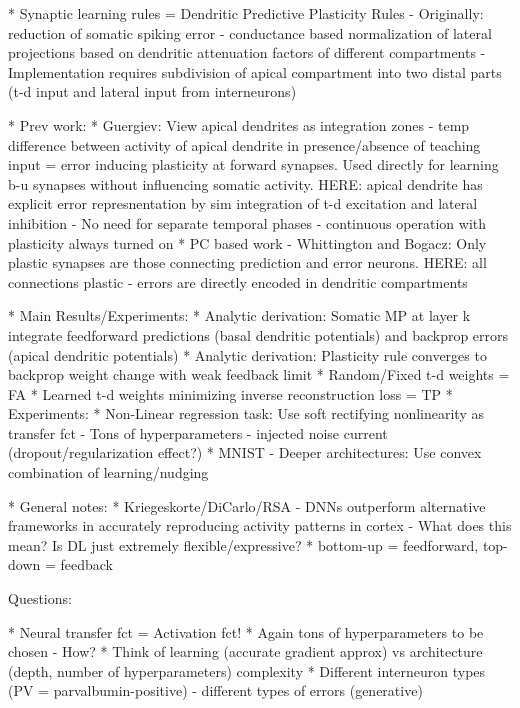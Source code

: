 \documentclass[colorinlistoftodos]{article}
\theoremstyle{definition}
\begin{document}
* Synaptic learning rules = Dendritic Predictive Plasticity Rules
    - Originally: reduction of somatic spiking error
    - conductance based normalization of lateral projections based on dendritic attenuation factors of different compartments
    - Implementation requires subdivision of apical compartment into two distal parts (t-d input and lateral input from interneurons)

* Prev work:
    * Guergiev: View apical dendrites as integration zones - temp difference between activity of apical dendrite in presence/absence of teaching input = error inducing plasticity at forward synapses. Used directly for learning b-u synapses without influencing somatic activity. HERE: apical dendrite has explicit error represnentation by sim integration of t-d excitation and lateral inhibition - No need for separate temporal phases - continuous operation with plasticity always turned on
    * PC based work - Whittington and Bogacz: Only plastic synapses are those connecting prediction and error neurons. HERE: all connections plastic - errors are directly encoded in dendritic compartments

* Main Results/Experiments:
    * Analytic derivation: Somatic MP at layer k integrate feedforward predictions (basal dendritic potentials) and backprop errors (apical dendritic potentials)
    * Analytic derivation: Plasticity rule converges to backprop weight change with weak feedback limit
    * Random/Fixed t-d weights = FA
    * Learned t-d weights minimizing inverse reconstruction loss = TP
    * Experiments:
        * Non-Linear regression task: Use soft rectifying nonlinearity as transfer fct - Tons of hyperparameters - injected noise current (dropout/regularization effect?)
        * MNIST - Deeper architectures: Use convex combination of learning/nudging

* General notes:
    * Kriegeskorte/DiCarlo/RSA - DNNs outperform alternative frameworks in accurately reproducing activity patterns in cortex - What does this mean? Is DL just extremely flexible/expressive?
    * bottom-up = feedforward, top-down = feedback


Questions:

* Neural transfer fct = Activation fct!
* Again tons of hyperparameters to be chosen - How?
* Think of learning (accurate gradient approx) vs architecture (depth, number of hyperparameters) complexity
* Different interneuron types (PV = parvalbumin-positive) - different types of errors (generative)
\end{document}
